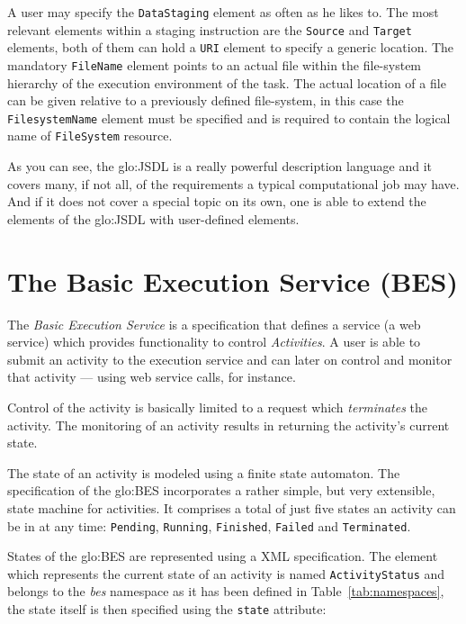 A user may  specify the \texttt{DataStaging} element as  often as he likes
to.   The most  relevant elements  within  a staging  instruction are  the
\texttt{Source}  and \texttt{Target}  elements, both  of them  can  hold a
\texttt{URI}  element  to  specify  a  generic  location.   The  mandatory
\texttt{FileName} element points to  an actual file within the file-system
hierarchy of the execution environment of the task. The actual location of
a file can be given relative  to a previously defined file-system, in this
case the \texttt{FilesystemName} element must be specified and is required
to contain the logical name of \texttt{FileSystem} resource.

As  you can  see,  the  \gls{glo:JSDL} is  a  really powerful  description
language and  it covers many,  if not all,  of the requirements  a typical
computational job  may have. And if it  does not cover a  special topic on
its own,  one is able  to extend the  elements of the  \gls{glo:JSDL} with
user-defined elements.

\section[The Basic Execution Service]{The Basic Execution Service (BES)}
\label{sec:fundamentals:bes}

The \emph{Basic Execution Service} \cite{ogsa-bes} is a specification that
defines  a service (\eg a  web service)  which provides  functionality to
control \emph{Activities}.   A user is able  to submit an  activity to the
execution service and  can later on control and  monitor that activity ---
using web service calls, for instance.

Control  of  the  activity  is   basically  limited  to  a  request  which
\emph{terminates} the  activity. The monitoring of an  activity results in
returning the activity's current state.

The state  of an activity is  modeled using a finite  state automaton. The
specification of the \gls{glo:BES}  incorporates a rather simple, but very
extensible, state  machine for  activities. It comprises  a total  of just
five  states  an  activity  can  be  in  at  any  time:  \texttt{Pending},
\texttt{Running},       \texttt{Finished},       \texttt{Failed}       and
\texttt{Terminated}.

States of the \gls{glo:BES} are represented using a XML specification. The
element  which  represents the  current  state  of  an activity  is  named
\texttt{ActivityStatus} and belongs to  the \emph{bes} namespace as it has
been  defined  in Table~\ref{tab:namespaces},  the  state  itself is  then
specified using the \texttt{state} attribute:

